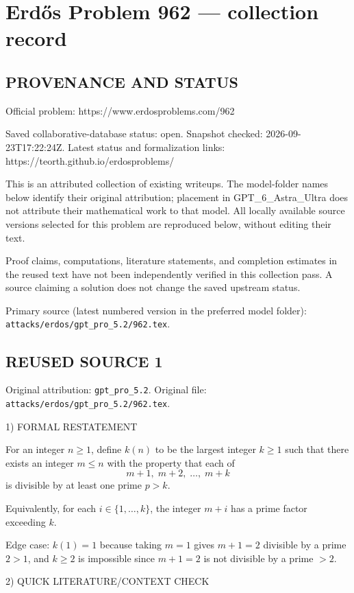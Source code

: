 \section*{Erd\H{o}s Problem 962 --- collection record}

\subsection*{PROVENANCE AND STATUS}
Official problem: https://www.erdosproblems.com/962

Saved collaborative-database status: open.
Snapshot checked: 2026-09-23T17:22:24Z.
Latest status and formalization links: https://teorth.github.io/erdosproblems/

This is an attributed collection of existing writeups. The model-folder names below identify their original attribution; placement in GPT\_6\_Astra\_Ultra does not attribute their mathematical work to that model. All locally available source versions selected for this problem are reproduced below, without editing their text.

Proof claims, computations, literature statements, and completion estimates in the reused text have not been independently verified in this collection pass. A source claiming a solution does not change the saved upstream status.

Primary source (latest numbered version in the preferred model folder): \texttt{attacks/erdos/gpt\_pro\_5.2/962.tex}.

\subsection*{REUSED SOURCE 1}
Original attribution: \texttt{gpt\_pro\_5.2}.
Original file: \texttt{attacks/erdos/gpt\_pro\_5.2/962.tex}.


1) FORMAL RESTATEMENT

For an integer $n\ge 1$, define $k(n)$ to be the largest integer $k\ge 1$ such that there exists an integer $m\le n$ with the property that each of
\[
 m+1,\;m+2,\;\dots,\;m+k
\]
is divisible by at least one prime $p>k$.

Equivalently, for each $i\in\{1,\dots,k\}$, the integer $m+i$ has a prime factor exceeding $k$.

Edge case: $k(1)=1$ because taking $m=1$ gives $m+1=2$ divisible by a prime $2>1$, and $k\ge 2$ is impossible since $m+1=2$ is not divisible by a prime $>2$.

2) QUICK LITERATURE/CONTEXT CHECK

